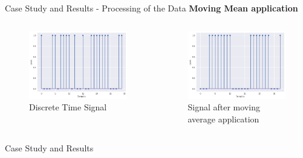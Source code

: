 \begin{frame}{Case Study and Results - Processing of the Data}
\centering \textbf{Moving Mean application}

\begin{columns}

    \begin{figure}
        \includegraphics[scale=0.3]{figuras/signalstem.png}
        \caption{Discrete Time Signal}
        \label{fig:stem}
    \end{figure}
    \begin{figure}
        \includegraphics[scale=0.3]{figuras/stemmoving.png}
        \caption{Signal after moving average application}
        \label{fig:stem}
    \end{figure}
\end{columns}

\end{frame}




\begin{frame}{Case Study and Results}
    
\end{frame}